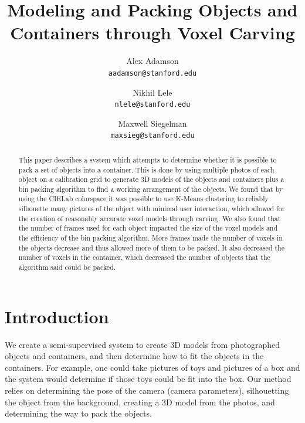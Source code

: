 \documentclass[10pt,twocolumn,letterpaper]{article}
\begin{document}
\title{Modeling and Packing Objects and Containers through Voxel Carving}

\author{Alex Adamson\\
{\tt\small aadamson@stanford.edu}
\and
Nikhil Lele \\
{\tt\small nlele@stanford.edu}
\and 
Maxwell Siegelman \\
{\tt\small maxsieg@stanford.edu}
}

\maketitle

\begin{abstract}
   This paper describes a system which attempts to determine whether it is possible to pack a set of objects into a container. This is done by using multiple photos of each object on a calibration grid to generate 3D models of the objects and containers plus a bin packing algorithm to find a working arrangement of the objects. We found that by using the CIELab colorspace it was possible to use K-Means clustering to reliably silhouette many pictures of the object with minimal user interaction, which allowed for the creation of reasonably accurate voxel models through carving. We also found that the number of frames used for each object impacted the size of the voxel models and the efficiency of the bin packing algorithm. More frames made the number of voxels in the objects decrease and thus allowed more of them to be packed. It also decreased the number of voxels in the container, which decreased the number of objects that the algorithm said could be packed. 
\end{abstract}


\section{Introduction}

We create a semi-supervised system to create 3D models from photographed objects and containers, and then determine how to fit the objects in the containers. For example, one could take pictures of toys and pictures of a box and the system would determine if those toys could be fit into the box. Our method relies on determining the pose of the camera (camera parameters), silhouetting the object from the background, creating a 3D model from the photos, and determining the way to pack the objects.
\end{document}
